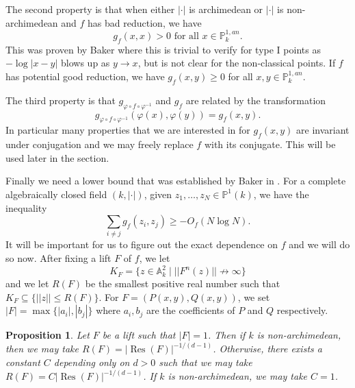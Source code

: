 \documentclass[10pt]{amsart}
\newcommand{\bb}{\mathbb}
\newcommand{\vphi}{\varphi}
\newcommand{\Res}{\operatorname{Res}}
\newcommand{\berkP}{\mathbb{P}^{1,an}}
\numberwithin{theorem}{section}
\newtheorem{proposition}[theorem]{Proposition}
\numberwithin{example}{section}
\numberwithin{definition}{section}
\begin{document}
The second property is that when either $| \cdot |$ is archimedean or $| \cdot |$ is non-archimedean and $f$ has bad reduction, we have 
$$g_f(x,x) > 0 \text{ for all } x \in \berkP_k.$$
This was proven by Baker \cite{Bak09} where this is trivial to verify for type I points as $-\log |x-y|$ blows up as $y \to x$, but is not clear for the non-classical points. If $f$ has potential good reduction, we have $g_f(x,y) \geq 0$ for all $x,y \in \berkP_k$.
\par 
The third property is that $g_{\vphi \circ f \circ \vphi^{-1}}$ and $g_f$ are related by the transformation 
\begin{equation} \label{eqref: ArakelovGreenMobius1}
g_{\vphi \circ f \circ \vphi^{-1}}(\vphi(x),\vphi(y)) = g_f(x,y).
\end{equation}
In particular many properties that we are interested in for $g_f(x,y)$ are invariant under conjugation and we may freely replace $f$ with its conjugate. This will be used later in the section. 
\par 
Finally we need a lower bound that was established by Baker in \cite{Bak06}. For a complete algebraically closed field $(k, | \cdot |)$, given $z_1,\ldots,z_N \in \bb{P}^1(k)$, we have the inequality 
$$\sum_{i \not = j} g_f(z_i,z_j) \geq - O_f(N \log N).$$
It will be important for us to figure out the exact dependence on $f$ and we will do so now. After fixing a lift $F$ of $f$, we let
$$K_F = \{z \in \bb{A}^2_k \mid ||F^n(z)|| \not \to \infty\}$$
and we let $R(F)$ be the smallest positive real number such that $K_F \subseteq \{ ||z|| \leq R(F)\}$. For $F = (P(x,y),Q(x,y))$, we set $|F| = \max\{|a_i|, |b_j|\}$ where $a_i,b_j$ are the coefficients of $P$ and $Q$ respectively. 

\begin{proposition} \label{BoundRadius1}
Let $F$ be a lift such that $|F| = 1$. Then if $k$ is non-archimedean, then we may take $R(F) = |\Res(F)|^{-1/(d-1)}$. Otherwise, there exists a constant $C$ depending only on $d > 0$ such that we may take $R(F) = C|\Res(F)|^{-1/(d-1)}$. If $k$ is non-archimedean, we may take $C = 1$. 
\end{proposition}
\end{document}
